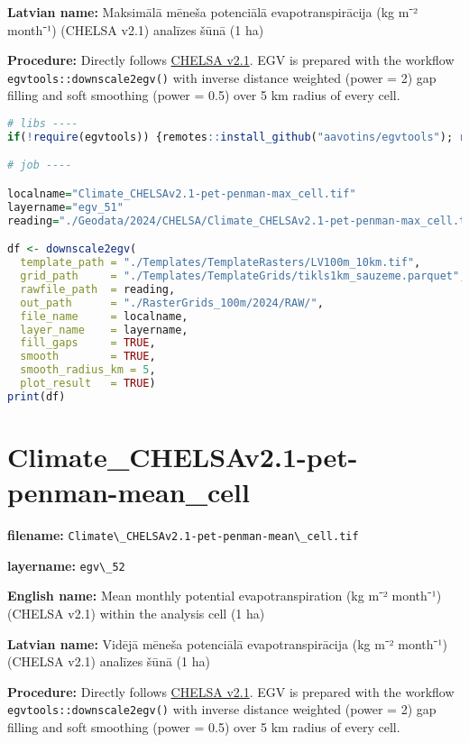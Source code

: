 \documentclass[
]{book}
\newcommand{\passthrough}[1]{#1}
\begin{document}
\textbf{Latvian name:} Maksimālā mēneša potenciālā evapotranspirācija (kg m⁻² month⁻¹) (CHELSA v2.1) analīzes šūnā (1 ha)

\textbf{Procedure:} Directly follows \hyperref[Ch04.11]{CHELSA v2.1}. EGV is prepared with the
workflow \passthrough{\lstinline!egvtools::downscale2egv()!} with inverse distance weighted (power = 2)
gap filling and soft smoothing (power = 0.5) over 5 km radius of every cell.

\begin{lstlisting}[language=R]
# libs ----
if(!require(egvtools)) {remotes::install_github("aavotins/egvtools"); require(egvtools)}

# job ----

localname="Climate_CHELSAv2.1-pet-penman-max_cell.tif"
layername="egv_51"
reading="./Geodata/2024/CHELSA/Climate_CHELSAv2.1-pet-penman-max_cell.tif"

df <- downscale2egv(
  template_path = "./Templates/TemplateRasters/LV100m_10km.tif",
  grid_path     = "./Templates/TemplateGrids/tikls1km_sauzeme.parquet",
  rawfile_path  = reading,
  out_path      = "./RasterGrids_100m/2024/RAW/",
  file_name     = localname,
  layer_name    = layername,
  fill_gaps     = TRUE,
  smooth        = TRUE,
  smooth_radius_km = 5,
  plot_result   = TRUE)
print(df)
\end{lstlisting}

\section{Climate\_CHELSAv2.1-pet-penman-mean\_cell}\label{ch06.052}

\textbf{filename:} \passthrough{\lstinline!Climate\_CHELSAv2.1-pet-penman-mean\_cell.tif!}

\textbf{layername:} \passthrough{\lstinline!egv\_52!}

\textbf{English name:} Mean monthly potential evapotranspiration (kg m⁻² month⁻¹) (CHELSA v2.1) within the analysis cell (1 ha)

\textbf{Latvian name:} Vidējā mēneša potenciālā evapotranspirācija (kg m⁻² month⁻¹) (CHELSA v2.1) analīzes šūnā (1 ha)

\textbf{Procedure:} Directly follows \hyperref[Ch04.11]{CHELSA v2.1}. EGV is prepared with the
workflow \passthrough{\lstinline!egvtools::downscale2egv()!} with inverse distance weighted (power = 2)
gap filling and soft smoothing (power = 0.5) over 5 km radius of every cell.
\end{document}
